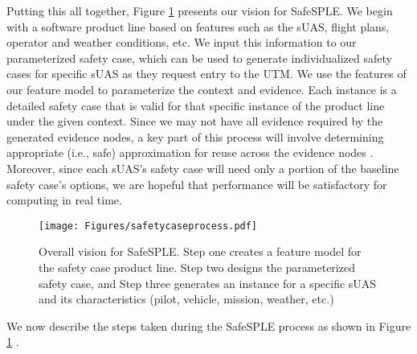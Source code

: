 Putting this all together, Figure \ref{fig:vision}  presents our vision for SafeSPLE. 
We begin with a software product line based on features such as the sUAS, flight plans, operator and weather conditions, etc.  We input this information to our parameterized safety case, which can be used to generate individualized safety cases for specific sUAS \cite{VierhauserBWXCH21} as they request entry to the UTM. We use the features of our feature model to parameterize the context and evidence. Each instance is a detailed safety case that is valid for that specific instance of the product line under the given context. Since we may not have all evidence required by the generated evidence nodes, a key part of this process will involve determining appropriate (i.e., safe) approximation for reuse across the evidence nodes \cite{AgrawalKVRCL19}.  
Moreover, since each sUAS's safety case will need only a portion of the baseline safety case's options, we are hopeful that performance will be satisfactory for computing in real time.  



 \begin{figure}[ht]
\centering
\texttt{[image: Figures/safetycaseprocess.pdf]}\caption{Overall vision for SafeSPLE. Step one creates a feature model for the safety case product line. Step two designs the parameterized safety case, and Step three generates an instance for a specific sUAS and its characteristics (pilot, vehicle, mission, weather, etc.)}\label{fig:vision}
\end{figure}

We now describe the steps taken during the SafeSPLE process as shown in Figure \ref{fig:vision} .

